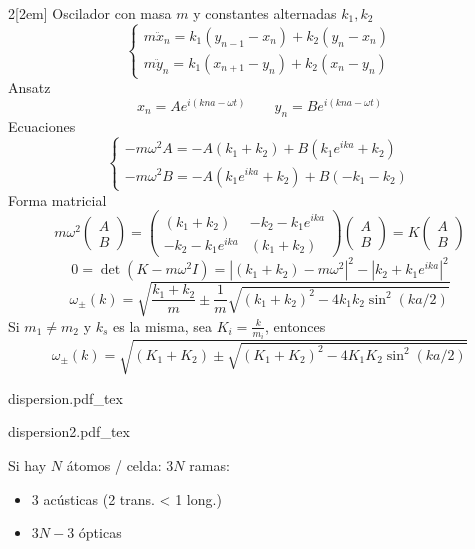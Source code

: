 \documentclass[leqno]{article}
\newcommand{\incfig}[1]{%
\begin{center}
\def\svgwidth{0.9\columnwidth}
{#1.pdf_tex}
\end{center}
}
\begin{document}
\begin{multicols}{2}[\columnsep2em]
Oscilador con masa $m$ y constantes alternadas  $k_1, k_2$
\[
  \begin{cases}
m\ddot{x}_n = k_1(y_{n-1}-x_n)+k_2(y_n-x_n)\\
m\ddot{y}_n = k_1(x_{n+1}-y_n)+k_2(x_n-y_n)
  \end{cases}
\] 
Ansatz
\[
x_n = A e^{i(kna-\omega t)} \qquad
y_n = B e^{i(kna-\omega t)}
\] 
Ecuaciones
\[
  \begin{cases}
-m\omega ^2 A = -A(k_1+k_2)+ B(k_1e^{ika}+k_2)\\
-m\omega ^2 B = -A(k_1e^{ika}+k_2)+ B(-k_1-k_2)
  \end{cases}
\] 
Forma matricial
\[
  m\omega ^2 \begin{pmatrix} A\\B \end{pmatrix} = \begin{pmatrix} (k_1+k_2) & -k_2 -k_1e^{ika} \\ -k_2-k_1e^{ika} & (k_1+k_2) \end{pmatrix}  \begin{pmatrix} A\\B \end{pmatrix} = K\begin{pmatrix} A\\B \end{pmatrix} 
\] 
 \[
0 = \det(K-m\omega ^2I) = |(k_1+k_2)-m\omega ^2|^2 - |k_2 +k_1e^{ika}|^2
\] 
\[
  \boxed{\omega _{\pm}(k) = \sqrt{ \frac{k_1+k_2}{m}\pm \frac{1}{m} \sqrt{(k_1+k_2)^2-4k_1k_2\sin^2(ka / 2)} } }
\] 
Si $m_1\neq m_2$ y $k_s$ es la misma, sea  $K_i = \frac{k}{m_i}$, entonces
\[
  \boxed{\omega _{\pm}(k) = \sqrt{ (K_1+K_2)\pm \sqrt{(K_1+K_2)^2-4K_1K_2\sin^2(ka / 2)} } }
\] 
\begin{minipage}{0.5\columnwidth}
\incfig{dispersion}
\end{minipage}
\begin{minipage}{0.5\columnwidth}
\incfig{dispersion2}
\end{minipage}

Si hay $N$ átomos / celda:  $3N$ ramas:
\begin{itemize}[topsep=-6pt, itemsep=0pt]
  \item 3 acústicas (2 trans. < 1 long.)
  \item $3N-3$ ópticas
\end{itemize}


\end{multicols}
\end{document}
